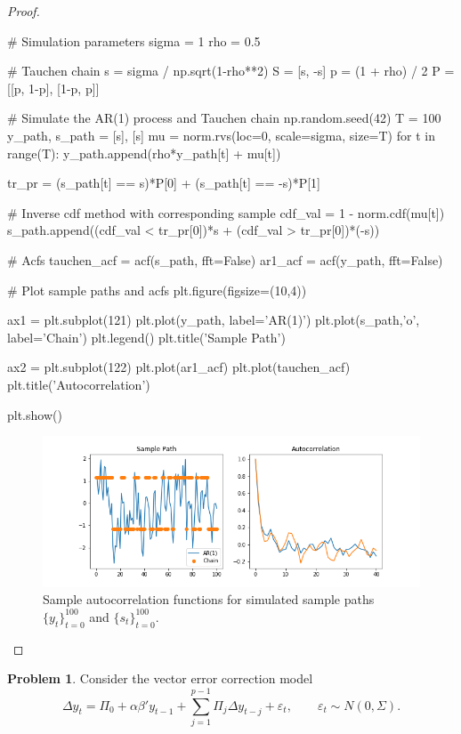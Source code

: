 \documentclass[oneside,reqno]{amsart}
\newcommand{\eps}{\varepsilon}
\theoremstyle{definition}
\newtheorem{prob}{Problem}
\begin{document}
\begin{enumerate}[label=(\roman*)]
\begin{proof}
\begin{python3code}
# Simulation parameters 
sigma = 1
rho = 0.5

# Tauchen chain
s = sigma / np.sqrt(1-rho**2)
S = [s, -s]
p = (1 + rho) / 2
P = [[p, 1-p], [1-p, p]]

# Simulate the AR(1) process and Tauchen chain
np.random.seed(42)
T = 100
y_path, s_path = [s], [s]
mu = norm.rvs(loc=0, scale=sigma, size=T)
for t in range(T):
    y_path.append(rho*y_path[t] + mu[t])
    
    tr_pr = (s_path[t] == s)*P[0] + (s_path[t] == -s)*P[1]
    
    # Inverse cdf method with corresponding sample
    cdf_val = 1 - norm.cdf(mu[t])
    s_path.append((cdf_val < tr_pr[0])*s + (cdf_val > tr_pr[0])*(-s))

# Acfs
tauchen_acf = acf(s_path, fft=False)
ar1_acf = acf(y_path, fft=False)

# Plot sample paths and acfs
plt.figure(figsize=(10,4))

ax1 = plt.subplot(121)
plt.plot(y_path, label='AR(1)')
plt.plot(s_path,'o', label='Chain')
plt.legend()
plt.title('Sample Path')

ax2 = plt.subplot(122)
plt.plot(ar1_acf)
plt.plot(tauchen_acf)
plt.title('Autocorrelation')

plt.show()
\end{python3code}

\begin{figure}
\includegraphics[width=\textwidth]{q1-sim}
\caption{Sample autocorrelation functions for simulated sample paths $\{y_t\}_{t=0}^{100}$ and $\{s_t\}_{t=0}^{100}$.}
\label{markov-ar1-acf-fig}
\end{figure}

\end{proof}
\end{enumerate}


\begin{prob}
Consider the vector error correction model
\begin{equation}\label{eq:vecm}
	\Delta y_t = \Pi_0 + \alpha \beta' y_{t-1} + \sum_{j=1}^{p-1} \Pi_j \Delta y_{t-j} + \eps_t, 
	\qquad \eps_t \sim N(0, \Sigma).
\end{equation}
\end{prob}
\end{document}
